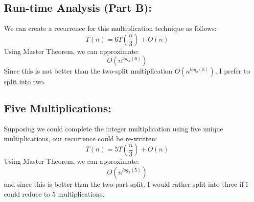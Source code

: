 \documentclass[conference]{styles/acmsiggraph}
\newcommand{\?}{\stackrel{?}{=}}
\begin{document}
\subsection{Run-time Analysis (Part B):}
We can create a recurrence for this multiplication technique as follows:
$$ T(n) = 6T\left(\frac{n}{3}\right) + O(n)$$
Using Master Theorem, we can approximate:
$$O(n^{log_3(6)})$$
Since this is not better than the two-split multiplication $O(n^{log_2(3)})$, I prefer to split into two.

\subsection{Five Multiplications:}
Supposing we could complete the integer multiplication using five unique multiplications, our recurrence could be re-written:
$$ T(n) = 5T\left(\frac{n}{3}\right) + O(n)$$
Using Master Theorem, we can approximate:
$$O(n^{log_3(5)})$$
and since this is better than the two-part split, I would rather split into three if I could reduce to 5 multiplications.

\newpage
\end{document}
